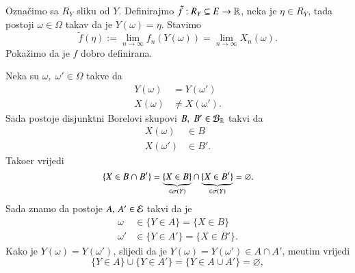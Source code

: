 \begin{rj}[\ref{zad:3.20}]
\begin{itemize}
\begin{enumerate}[label=(\arabic*. korak)]
            Ozna\v cimo sa $R_Y$ sliku od $Y$.
            Definirajmo $\tilde{f} : R_Y \subseteq E \to \mathbb{R}$, neka je $\eta \in R_Y$, tada postoji $\omega \in \Omega$ takav da je $Y(\omega) = \eta$. 
            Stavimo
            \begin{equation*}
                \tilde{f} (\eta) := \lim\limits_{n \to \infty} f_n (Y(\omega)) = \lim\limits_{n \to \infty} X_n (\omega).
            \end{equation*}
            Poka\v zimo da je $f$ dobro definirana.

            Neka su $\omega, \; \omega' \in \Omega$ takve da
            \begin{equation*}
                \begin{aligned}
                    Y(\omega) &= Y(\omega')\\
                    X(\omega) &\neq X(\omega').
                \end{aligned}
            \end{equation*}
            Sada postoje disjunktni Borelovi skupovi $B, \; B' \in \mathcal{B}_{\mathbb{R}}$ takvi da
            \begin{equation*}
                \begin{aligned}
                    X(\omega) &\in B\\
                    X(\omega') &\in B'.
                \end{aligned}
            \end{equation*}
            Tako\dj er vrijedi
            \begin{equation*}
                \{X \in B \cap B'\} = \underbrace{\{X \in B\}}_{\in \sigma({Y})} \cap \underbrace{\{X \in B'\}}_{\in \sigma({Y})} = \varnothing.
            \end{equation*}
            Sada znamo da postoje $A, \, A' \in \mathcal{E}$ takvi da je
            \begin{equation*}
                \begin{aligned}
                    \omega &\in \{Y \in A\} = \{X \in B\}\\
                    \omega' &\in \{Y \in A'\} = \{X \in B'\}.
                \end{aligned}
            \end{equation*}
            Kako je $Y(\omega) = Y (\omega')$, slijedi da je $Y(\omega) = Y(\omega') \in A \cap A'$, me\dj utim vrijedi
            \begin{equation*}
                \{Y \in A\} \cup \{Y \in A'\} = \{Y \in A \cup A'\} = \varnothing,

\end{equation*}
\end{enumerate}
\end{itemize}
\end{rj}
